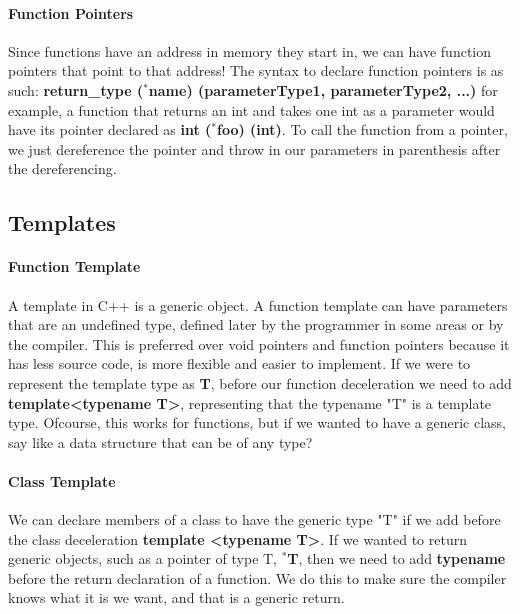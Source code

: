 \paragraph{Function Pointers} Since functions have an address in memory they start in, we can have function pointers that point to that address! The syntax to declare function pointers is as such: \textbf{return\_type ($^*$name) (parameterType1, parameterType2, ...)} for example, a function that returns an int and takes one int as a parameter would have its pointer declared as \textbf{int ($^*$foo) (int)}. To call the function from a pointer, we just dereference the pointer and throw in our parameters in parenthesis after the dereferencing.
\subsection{Templates}
\paragraph{Function Template} A template in C++ is a generic object. A function template can have parameters that are an undefined type, defined later by the programmer in some areas or by the compiler. This is preferred over void pointers and function pointers because it has less source code, is more flexible and easier to implement. If we were to represent the template type as \textbf{T}, before our function deceleration we need to add \textbf{template<typename T>}, representing that the typename "T" is a template type. Ofcourse, this works for functions, but if we wanted to have a generic class, say like a data structure that can be of any type?
\paragraph{Class Template} We can declare members of a class to have the generic type "T" if we add before the class deceleration \textbf{template <typename T>}. If we wanted to return generic objects, such as a pointer of type T, \textbf{$^*$T}, then we need to add \textbf{typename} before the return declaration of a function. We do this to make sure the compiler knows what it is we want, and that is a generic return.
